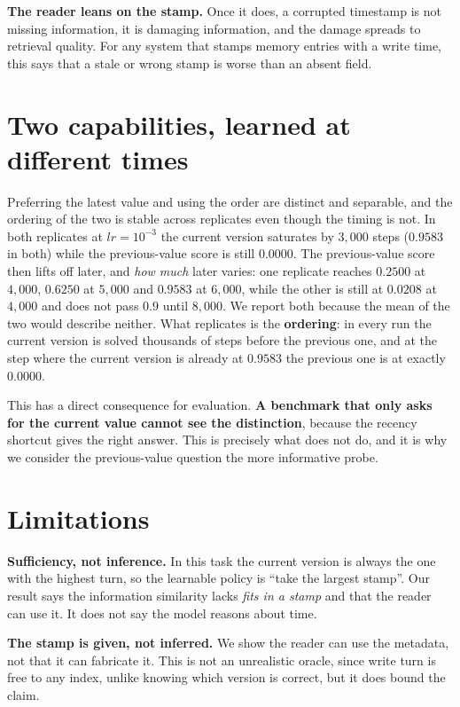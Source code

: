 \documentclass[11pt,a4paper]{article}
\begin{document}
\textbf{The reader leans on the stamp.} Once it does, a corrupted timestamp is not missing information,
it is damaging information, and the damage spreads to retrieval quality. For any system that stamps
memory entries with a write time, this says that a stale or wrong stamp is worse than an absent field.

\section{Two capabilities, learned at different times}

Preferring the latest value and using the order are distinct and separable, and the ordering of the
two is stable across replicates even though the timing is not. In both replicates at $lr=10^{-3}$ the
current version saturates by $3{,}000$ steps ($0.9583$ in both) while the previous-value score is
still $0.0000$. The previous-value score then lifts off later, and \emph{how much} later varies: one
replicate reaches $0.2500$ at $4{,}000$, $0.6250$ at $5{,}000$ and $0.9583$ at $6{,}000$, while the
other is still at $0.0208$ at $4{,}000$ and does not pass $0.9$ until $8{,}000$. We report both because
the mean of the two would describe neither. What replicates is the \textbf{ordering}: in every run the
current version is solved thousands of steps before the previous one, and at the step where the current
version is already at $0.9583$ the previous one is at exactly $0.0000$.

This has a direct consequence for evaluation. \textbf{A benchmark that only asks for the current value
cannot see the distinction}, because the recency shortcut gives the right answer. This is precisely
what \citet{unabletoforget} does not do, and it is why we consider the previous-value question the more
informative probe.

\section{Limitations}

\textbf{Sufficiency, not inference.} In this task the current version is always the one with the
highest turn, so the learnable policy is ``take the largest stamp''. Our result says the information
similarity lacks \emph{fits in a stamp} and that the reader can use it. It does not say the model
reasons about time.

\textbf{The stamp is given, not inferred.} We show the reader can use the metadata, not that it can
fabricate it. This is not an unrealistic oracle, since write turn is free to any index, unlike knowing
which version is correct, but it does bound the claim.
\end{document}
